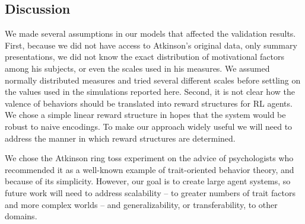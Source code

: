 \subsection{Discussion}

We made several assumptions in our models that affected the validation results.  First, because we did not have access to Atkinson's original data, only summary presentations, we did not know the exact distribution of motivational factors among his subjects, or even the scales used in his measures.  We assumed normally distributed measures and tried several different scales before settling on the values used in the simulations reported here.  Second, it is not clear how the valence of behaviors should be translated into reward structures for RL agents.  We chose a simple linear reward structure in hopes that the system would be robust to naive encodings.  To make our approach widely useful we will need to address the manner in which reward structures are determined.


We chose the Atkinson ring toss experiment on the advice of psychologists who recommended it as a well-known example of trait-oriented behavior theory, and because of its simplicity. However, our goal is to create large agent systems, so future work will need to address scalability -- to greater numbers of trait factors and more complex worlds -- and generalizability, or transferability, to other domains.




